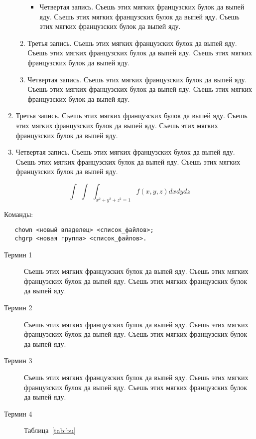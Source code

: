 \documentclass{./../class/UIR}
\begin{document}
\begin{enumerate}
\begin{enumerate}
\begin{itemize}
                \item Четвертая запись. Съешь этих мягких французских булок да выпей яду. Съешь этих мягких французских булок да выпей яду. Съешь этих мягких французских булок да выпей яду.
            \end{itemize}
            
            \item Третья запись. Съешь этих мягких французских булок да выпей яду. Съешь этих мягких французских булок да выпей яду. Съешь этих мягких французских булок да выпей яду.
            \item Четвертая запись. Съешь этих мягких французских булок да выпей яду. Съешь этих мягких французских булок да выпей яду. Съешь этих мягких французских булок да выпей яду.
        \end{enumerate}
        
        \item Третья запись. Съешь этих мягких французских булок да выпей яду. Съешь этих мягких французских булок да выпей яду. Съешь этих мягких французских булок да выпей яду.
        \item Четвертая запись. Съешь этих мягких французских булок да выпей яду. Съешь этих мягких французских булок да выпей яду. Съешь этих мягких французских булок да выпей яду.
    \end{enumerate}
    
    \begin{equation}
        \int\,\,\int\,\,\int_{x^2 + y^2 + z^2 = 1} f(x, y, z) dx dy dz
    \end{equation}
    
Команды:
\begin{verbatim}
   chown <новый владелец> <список_файлов>;
   chgrp <новая группа> <список_файлов>.
\end{verbatim}   
    
    \begin{description}
        \item[Термин 1] Съешь этих мягких французских булок да выпей яду. Съешь этих мягких французских булок да выпей яду. Съешь этих мягких французских булок да выпей яду.
        \item[Термин 2] Съешь этих мягких французских булок да выпей яду. Съешь этих мягких французских булок да выпей яду. Съешь этих мягких французских булок да выпей яду.
        \item[Термин 3] Съешь этих мягких французских булок да выпей яду. Съешь этих мягких французских булок да выпей яду. Съешь этих мягких французских булок да выпей яду.
        \item[Термин 4] Таблица~\ref{tab:bu}
    \end{description}
\end{document}
